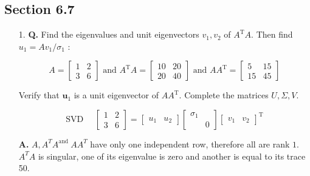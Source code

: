 \documentclass[main.tex]{subfiles}
\begin{document}
\subsection{Section 6.7}
\begin{enumerate}
    \item [1.] \textbf{Q.} Find the eigenvalues and unit eigenvectors $v_{1}, v_{2}$ of $A^{\mathrm{T}} A$. Then find $u_{1}=A v_{1} / \sigma_{1}$ : 
    
    $$
    A=\left[\begin{array}{ll}1 & 2 \\ 3 & 6\end{array}\right]  \text{ and } 
    A^{\mathrm{T}} A=\left[\begin{array}{ll}10 & 20 \\ 20 & 40\end{array}\right] \text{ and }
    AA^{\mathrm{T}}=\left[\begin{array}{rr}5 & 15 \\ 15 & 45\end{array}\right]
    $$ 
    
    Verify that $\boldsymbol{u}_{1}$ is a unit eigenvector of $A A^{\mathrm{T}}$. Complete the matrices $U, \Sigma, V$.
    
    $$
    \text{SVD } \quad
    \left[\begin{array}{ll}
    1 & 2 \\
    3 & 6
    \end{array}\right]=\left[\begin{array}{ll}
    u_{1} & u_{2}
    \end{array}\right]\left[\begin{array}{ll}
    \sigma_{1} & \\
    & 0
    \end{array}\right]\left[\begin{array}{ll}
    v_{1} & v_{2}
    \end{array}\right]^{\mathrm{T}}
    $$
    
    \textbf{A.} $A, A^{T} A^{\text {and }} A A^{T}$ have only one independent row, therefore all are rank $1$. $A^{T} A$ is singular, one of its eigenvalue is zero and another is equal to its trace 50. 


\end{enumerate}
\end{document}
